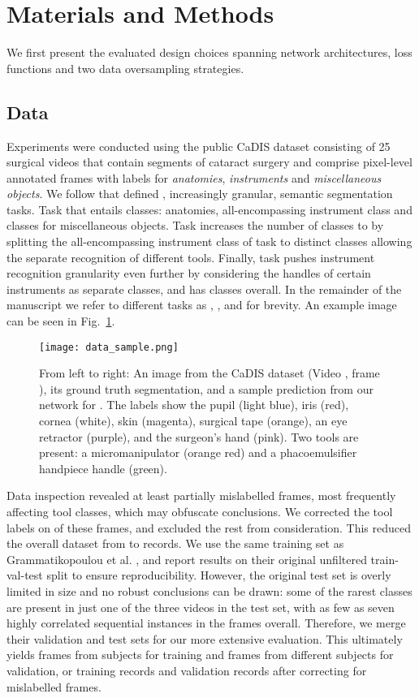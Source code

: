 \documentclass[runningheads]{llncs}
\newcommand{\ta}[1]{\textbf{}}
\begin{document}
\section{Materials and Methods}\label{methods}
We first present the evaluated design choices spanning network architectures, loss functions and two data oversampling strategies.

\subsection{Data}\label{methods:data}
Experiments were conducted using the public CaDIS dataset \cite{CaDIS} consisting of 25 surgical videos that contain segments of cataract surgery and comprise  pixel-level annotated frames with labels for \textit{anatomies}, \textit{instruments} and \textit{miscellaneous objects}. We follow \cite{CaDIS} that defined , increasingly granular, semantic segmentation tasks. Task  that entails  classes:  anatomies,  all-encompassing instrument class and  classes for miscellaneous objects. Task  increases the number of classes to  by splitting the all-encompassing instrument class of task  to  distinct classes allowing the separate recognition of different tools. Finally, task  pushes instrument recognition granularity even further by considering the handles of certain instruments as separate classes, and has  classes overall. In the remainder of the manuscript we refer to different tasks as \ta1, \ta2, and \ta3 for brevity. An example image can be seen in Fig.~\ref{fig:data}.

\begin{figure}[b]
    \centering
    \texttt{[image: data\_sample.png]}
    \caption{From left to right: An image from the CaDIS dataset (Video , frame ), its ground truth segmentation, and a sample prediction from our network for \ta3. The labels show the pupil (light blue), iris (red), cornea (white), skin (magenta), surgical tape (orange), an eye retractor (purple), and the surgeon's hand (pink). Two tools are present: a micromanipulator (orange red) and a phacoemulsifier handpiece handle (green).}
    \label{fig:data}
\end{figure}

Data inspection \cite{karpathy_recipe} revealed  at least partially mislabelled frames, most frequently affecting tool classes, which may obfuscate conclusions. We corrected the tool labels on  of these frames, and excluded the rest from consideration. This reduced the overall dataset from  to  records. We use the same training set as Grammatikopoulou et al. \cite{CaDIS}, and report results on their original unfiltered train-val-test split to ensure reproducibility. However, the original test set \cite{CaDIS} is overly limited in size and no robust conclusions can be drawn: some of the rarest classes are present in just one of the three videos in the test set, with as few as seven highly correlated sequential instances in the  frames overall. Therefore, we merge their validation and test sets for our more extensive evaluation. This ultimately yields  frames from  subjects for training and  frames from  different subjects for validation, or  training records and  validation records after correcting for mislabelled frames.
\end{document}
